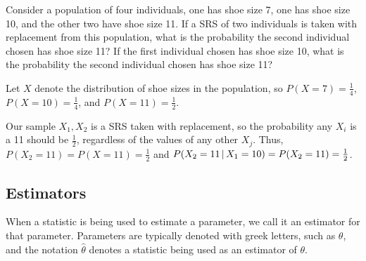 \begin{examp} Consider a population of four individuals, one has shoe size 7, one has shoe size 10, and the other two have shoe size 11. If a SRS of two individuals is taken with replacement from this population, what is the probability the second individual chosen has shoe size 11? If the first individual chosen has shoe size 10, what is the probability the second individual chosen has shoe size 11?
\par
\noindent Let $X$ denote the distribution of shoe sizes in the population, so $P(X = 7) = \frac{1}{4}$, $P(X = 10) = \frac{1}{4}$, and $P(X = 11) = \frac{1}{2}$.
\par
\noindent Our sample $X_1, X_2$ is a SRS taken with replacement, so the probability any $X_i$ is a 11 should be $\frac{1}{2}$, regardless of the values of any other $X_j$. Thus, $P(X_2 = 11) = P(X = 11) = \textstyle\frac{1}{2}$ and $P(X_2 = 11 \,|\, X_1 = 10) = P(X_2 = 11) = \textstyle\frac{1}{2}$.
\end{examp}

\subsection*{Estimators}

When a statistic is being used to estimate a parameter, we call it an estimator for that parameter. Parameters are typically denoted with greek letters, such as $\theta$, and the notation $\widehat{\theta}$ denotes a statistic being used as an estimator of $\theta$.

